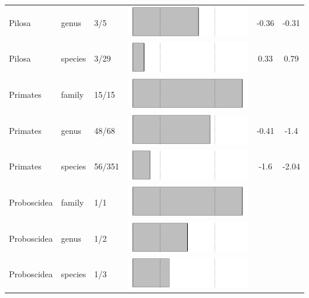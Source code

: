 \begin{longtable}{lL{1.8cm}C{2cm}lcc}
  Pilosa & genus & 3/5 & \includegraphics[width=0.20\linewidth, height=0.05\linewidth]{Missing_mammals/Table_figures/bar62.pdf} & -0.36 & -0.31 \\ 
  Pilosa & species & 3/29 & \includegraphics[width=0.20\linewidth, height=0.05\linewidth]{Missing_mammals/Table_figures/bar63.pdf} & 0.33 & 0.79 \\ 
  Primates & family & 15/15 & \includegraphics[width=0.20\linewidth, height=0.05\linewidth]{Missing_mammals/Table_figures/bar64.pdf} &   &   \\ 
  Primates & genus & 48/68 & \includegraphics[width=0.20\linewidth, height=0.05\linewidth]{Missing_mammals/Table_figures/bar65.pdf} & -0.41 & -1.4 \\ 
  Primates & species & 56/351 & \includegraphics[width=0.20\linewidth, height=0.05\linewidth]{Missing_mammals/Table_figures/bar66.pdf} & -1.6 & -2.04 \\ 
  Proboscidea & family & 1/1 & \includegraphics[width=0.20\linewidth, height=0.05\linewidth]{Missing_mammals/Table_figures/bar67.pdf} &   &   \\ 
  Proboscidea & genus & 1/2 & \includegraphics[width=0.20\linewidth, height=0.05\linewidth]{Missing_mammals/Table_figures/bar68.pdf} &   &   \\ 
  Proboscidea & species & 1/3 & \includegraphics[width=0.20\linewidth, height=0.05\linewidth]{Missing_mammals/Table_figures/bar69.pdf} &   &   \\ 

\end{longtable}
